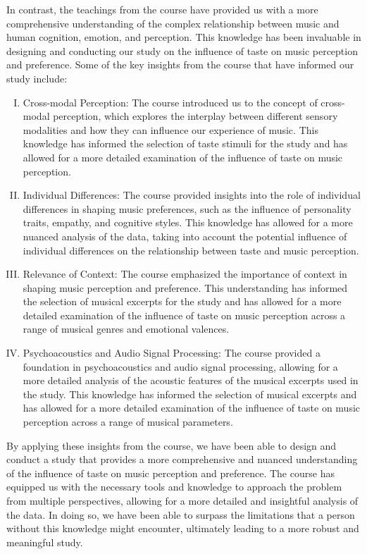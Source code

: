 \documentclass[conference]{IEEEtran}
\begin{document}
In contrast, the teachings from the course have provided us with a more comprehensive understanding of the complex relationship between music and human cognition, emotion, and perception. This knowledge has been invaluable in designing and conducting our study on the influence of taste on music perception and preference. Some of the key insights from the course that have informed our study include:
\begin{enumerate}[I.]
  \item Cross-modal Perception: The course introduced us to the concept of cross-modal perception, which explores the interplay between different sensory modalities and how they can influence our experience of music. This knowledge has informed the selection of taste stimuli for the study and has allowed for a more detailed examination of the influence of taste on music perception.
  \item Individual Differences: The course provided insights into the role of individual differences in shaping music preferences, such as the influence of personality traits, empathy, and cognitive styles. This knowledge has allowed for a more nuanced analysis of the data, taking into account the potential influence of individual differences on the relationship between taste and music perception.
  \item Relevance of Context: The course emphasized the importance of context in shaping music perception and preference. This understanding has informed the selection of musical excerpts for the study and has allowed for a more detailed examination of the influence of taste on music perception across a range of musical genres and emotional valences.

  \item Psychoacoustics and Audio Signal Processing: The course provided a foundation in psychoacoustics and audio signal processing, allowing for a more detailed analysis of the acoustic features of the musical excerpts used in the study. This knowledge has informed the selection of musical excerpts and has allowed for a more detailed examination of the influence of taste on music perception across a range of musical parameters.
\end{enumerate}
By applying these insights from the course, we have been able to design and conduct a study that provides a more comprehensive and nuanced understanding of the influence of taste on music perception and preference. The course has equipped us with the necessary tools and knowledge to approach the problem from multiple perspectives, allowing for a more detailed and insightful analysis of the data. In doing so, we have been able to surpass the limitations that a person without this knowledge might encounter, ultimately leading to a more robust and meaningful study.
\end{document}
